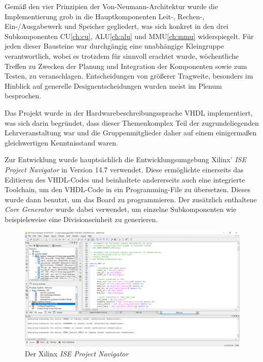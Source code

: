 Gem\"a\ss{} den vier Prinzipien der Von-Neumann-Architektur wurde die
Implementierung grob in die Hauptkomponenten Leit-, Rechen-,
Ein-/Ausgabewerk und Speicher gegliedert, was sich konkret in den drei
Subkomponenten CU\ref{ch:cu}, ALU\ref{ch:alu} und MMU\ref{ch:mmu}
widerspiegelt. F\"ur jeden dieser Bausteine war durchg\"angig eine
unabh\"angige Kleingruppe verantwortlich, wobei es trotzdem f\"ur sinnvoll
erachtet wurde, w\"ochentliche Treffen zu Zwecken der Planung und Integration
der Komponenten sowie zum Testen, zu veranschlagen. Entscheidungen von
gr\"o\ss{}erer Tragweite, besonders im Hinblick auf generelle
Designentscheidungen wurden meist im Plenum besprochen.

Das Projekt wurde in der Hardwarebeschreibungssprache VHDL implementiert, was
sich darin begr\"undet, dass dieser Themenkomplex Teil der zugrundeliegenden
Lehrveranstaltung war und die Gruppenmitglieder daher auf einem
einigerma\ss{}en gleichwertigen Kenntnisstand waren.

Zur Entwicklung wurde haupts\"achlich die Entwicklungsumgebung Xilinx'
\textit{ISE Project Navigator} in Version 14.7 verwendet. Diese erm\"oglichte
einerseits das Editieren des VHDL-Codes und beinhaltete andererseits auch eine
integrierte Toolchain, um den VHDL-Code in ein Programming-File zu
\"ubersetzen. Dieses wurde dann benutzt, um das Board zu programmieren. Der
zus\"atzlich enthaltene \textit{Core Generator} wurde dabei verwendet, um
einzelne Subkomponenten wie beispielsweise eine Divisionseinheit zu generieren.

\begin{figure}[H]
\centering
\includegraphics[width=1.0\textwidth]{ISE.png}
\caption{Der Xilinx \textit{ISE Project Navigator}}
\label{fig:tool}
\end{figure}

